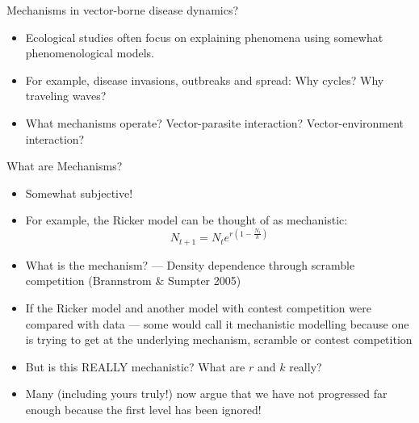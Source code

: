 \documentclass[xcolor=x11names,compress]{beamer}
\renewcommand{\(}{\begin{columns}}
\renewcommand{\)}{\end{columns}}
\newcommand{\<}[1]{\begin{column}{#1}}
\renewcommand{\>}{\end{column}}
\begin{document}
\begin{frame}{Mechanisms in vector-borne disease dynamics?}

\begin{itemize}[<+->] \itemsep12pt
	\item Ecological studies often focus on explaining phenomena 
	using somewhat phenomenological models. 
	
	\item For example, disease invasions, outbreaks and spread: Why cycles? Why traveling waves? 
	
	\item What mechanisms operate? Vector-parasite interaction? Vector-environment interaction? 

\end{itemize}

\end{frame}

\begin{frame}{What are Mechanisms?}

   \begin{itemize}[<+->] \itemsep4pt{}
			\item Somewhat subjective! 
			\item For example, the Ricker model can be thought of as 
			mechanistic:
			\begin{equation} 
				N_{t+1} = N_t e^{r\left(1-\frac{N_t}{k}\right)} 
			\end{equation} 
				
			\item What is the mechanism? --- Density dependence through scramble competition 
			(Brannstrom \& Sumpter 2005)

			\item If the Ricker model and another model with contest 
			competition were compared with data --- some would call it mechanistic 
			modelling because one is trying to get at the underlying 
			mechanism, scramble or contest competition
			
			\item But is this REALLY mechanistic? What are $r$ and $k$ really?
	
			\item Many (including yours truly!) now argue that we have not 
			progressed far enough because the first level has been ignored!
   \end{itemize}

\end{frame}
\end{document}
